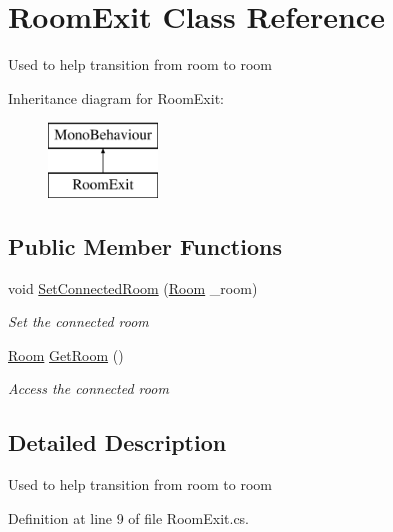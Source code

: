 \hypertarget{class_room_exit}{}\section{Room\+Exit Class Reference}
\label{class_room_exit}


Used to help transition from room to room  


Inheritance diagram for Room\+Exit\+:\begin{figure}[H]
\begin{center}
\leavevmode
\includegraphics[height=2.000000cm]{class_room_exit}
\end{center}
\end{figure}
\subsection*{Public Member Functions}
\begin{DoxyCompactItemize}
\item 
void \mbox{\hyperlink{class_room_exit_adfc62765726e94628e9f04191d940a04}{Set\+Connected\+Room}} (\mbox{\hyperlink{class_level_generation_1_1_room}{Room}} \+\_\+room)
\begin{DoxyCompactList}\small\item\em Set the connected room \end{DoxyCompactList}\item 
\mbox{\hyperlink{class_level_generation_1_1_room}{Room}} \mbox{\hyperlink{class_room_exit_a43eb9678e9d5a584e124d88d7da03d52}{Get\+Room}} ()
\begin{DoxyCompactList}\small\item\em Access the connected room \end{DoxyCompactList}\end{DoxyCompactItemize}


\subsection{Detailed Description}
Used to help transition from room to room 



Definition at line 9 of file Room\+Exit.\+cs.




